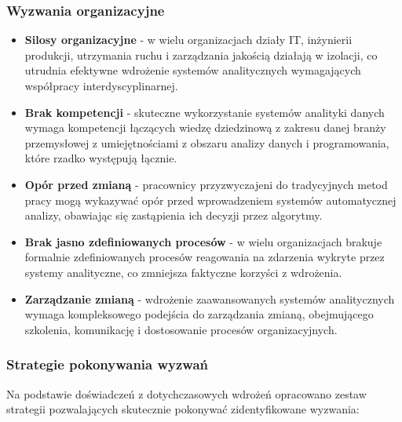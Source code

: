 \subsubsection{Wyzwania organizacyjne}
\label{subsubsec:wyzwania_organizacyjne}

\begin{itemize}
    \item \textbf{Silosy organizacyjne} - w wielu organizacjach działy IT, inżynierii produkcji, utrzymania ruchu i zarządzania jakością działają w izolacji, co utrudnia efektywne wdrożenie systemów analitycznych wymagających współpracy interdyscyplinarnej.
    \item \textbf{Brak kompetencji} - skuteczne wykorzystanie systemów analityki danych wymaga kompetencji łączących wiedzę dziedzinową z zakresu danej branży przemysłowej z umiejętnościami z obszaru analizy danych i programowania, które rzadko występują łącznie.
    \item \textbf{Opór przed zmianą} - pracownicy przyzwyczajeni do tradycyjnych metod pracy mogą wykazywać opór przed wprowadzeniem systemów automatycznej analizy, obawiając się zastąpienia ich decyzji przez algorytmy.
    \item \textbf{Brak jasno zdefiniowanych procesów} - w wielu organizacjach brakuje formalnie zdefiniowanych procesów reagowania na zdarzenia wykryte przez systemy analityczne, co zmniejsza faktyczne korzyści z wdrożenia.
    \item \textbf{Zarządzanie zmianą} - wdrożenie zaawansowanych systemów analitycznych wymaga kompleksowego podejścia do zarządzania zmianą, obejmującego szkolenia, komunikację i dostosowanie procesów organizacyjnych.
\end{itemize}

\subsubsection{Strategie pokonywania wyzwań}
\label{subsubsec:strategie_pokonywania}

Na podstawie doświadczeń z dotychczasowych wdrożeń opracowano zestaw strategii pozwalających skutecznie pokonywać zidentyfikowane wyzwania:

